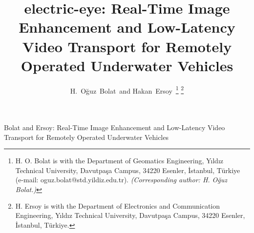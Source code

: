 \documentclass[12pt,journal,onecolumn,draftclsnofoot]{IEEEtran}
\begin{document}
\title{electric-eye: Real-Time Image Enhancement and Low-Latency Video
Transport for Remotely Operated Underwater Vehicles}

\author{H.~O\u{g}uz~Bolat\, and
  Hakan~Ersoy\,%
  \thanks{H. O. Bolat is with the Department of Geomatics
    Engineering, Y\i{}ld\i{}z
    Technical University, Davutpa\c{s}a Campus, 34220 Esenler,
    \.Istanbul, T\"urkiye
    (e-mail: oguz.bolat@std.yildiz.edu.tr). \emph{(Corresponding
        author: H. O\u{g}uz
  Bolat.)}}%
  \thanks{H. Ersoy is with the Department of Electronics and
    Communication Engineering,
    Y\i{}ld\i{}z Technical University, Davutpa\c{s}a Campus, 34220
    Esenler, \.Istanbul,
T\"urkiye.}}

\ifreview
\markboth{}{}
\else
{}%
{Bolat and Ersoy: Real-Time Image Enhancement and Low-Latency Video
  Transport for
Remotely Operated Underwater Vehicles}
\fi

\maketitle
\end{document}
